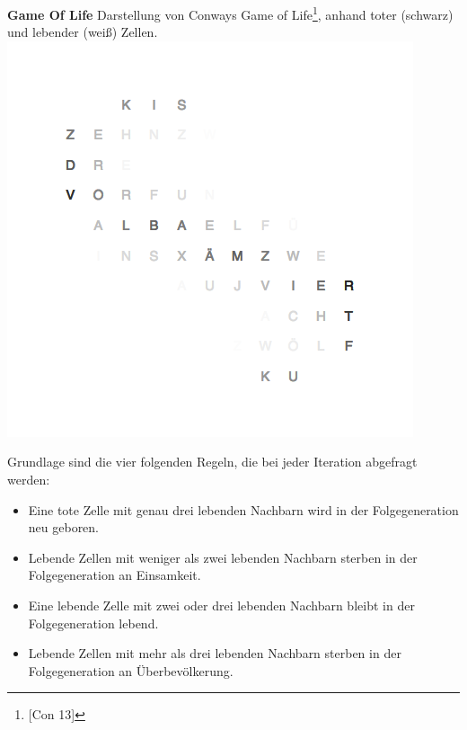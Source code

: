 \begin{multicols}{2}
\textbf{Game Of Life}
Darstellung von Conways Game of Life\footnote{[Con 13]}, anhand toter (schwarz) und lebender (weiß) Zellen.
\includegraphics[width=\columnwidth]{Abbildungen/Software/Demo/Helix}

Grundlage sind die vier folgenden Regeln, die bei jeder Iteration abgefragt werden:
\begin{itemize}
    \item Eine tote Zelle mit genau drei lebenden Nachbarn wird in der Folgegeneration neu geboren.
    \item Lebende Zellen mit weniger als zwei lebenden Nachbarn sterben in der Folgegeneration an Einsamkeit.
    \item Eine lebende Zelle mit zwei oder drei lebenden Nachbarn bleibt in der Folgegeneration lebend.
    \item Lebende Zellen mit mehr als drei lebenden Nachbarn sterben in der Folgegeneration an Überbevölkerung.
\end{itemize}


\end{multicols}
